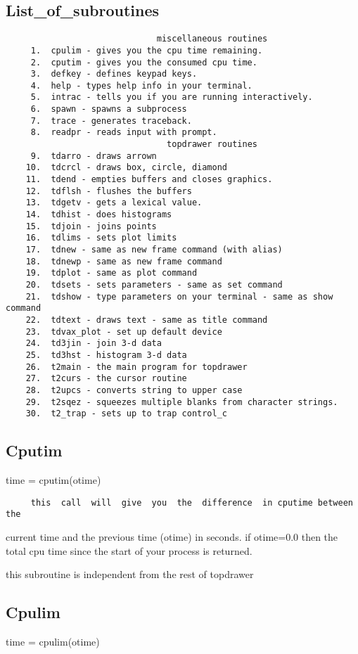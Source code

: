 \subsection{List\_of\_subroutines}
\begin{verbatim}
                              miscellaneous routines
     1.  cpulim - gives you the cpu time remaining.  
     2.  cputim - gives you the consumed cpu time.  
     3.  defkey - defines keypad keys.  
     4.  help - types help info in your terminal.  
     5.  intrac - tells you if you are running interactively.  
     6.  spawn - spawns a subprocess 
     7.  trace - generates traceback.  
     8.  readpr - reads input with prompt.  
                                topdrawer routines
     9.  tdarro - draws arrown 
    10.  tdcrcl - draws box, circle, diamond 
    11.  tdend - empties buffers and closes graphics.  
    12.  tdflsh - flushes the buffers 
    13.  tdgetv - gets a lexical value.  
    14.  tdhist - does histograms 
    15.  tdjoin - joins points 
    16.  tdlims - sets plot limits 
    17.  tdnew - same as new frame command (with alias) 
    18.  tdnewp - same as new frame command 
    19.  tdplot - same as plot command 
    20.  tdsets - sets parameters - same as set command 
    21.  tdshow - type parameters on your terminal - same as show command 
    22.  tdtext - draws text - same as title command 
    23.  tdvax_plot - set up default device 
    24.  td3jin - join 3-d data 
    25.  td3hst - histogram 3-d data 
    26.  t2main - the main program for topdrawer 
    27.  t2curs - the cursor routine 
    28.  t2upcs - converts string to upper case 
    29.  t2sqez - squeezes multiple blanks from character strings.  
    30.  t2_trap - sets up to trap control_c 
\end{verbatim}
\subsection{Cputim}
time = cputim(otime) 

\begin{verbatim}
     this  call  will  give  you  the  difference  in cputime between the
\end{verbatim}
current time and the previous time (otime) in seconds.  if otime=0.0 then
the total cpu time since the start of your process is returned.  

this subroutine is independent from the rest of topdrawer 
\subsection{Cpulim}
time = cpulim(otime) 

